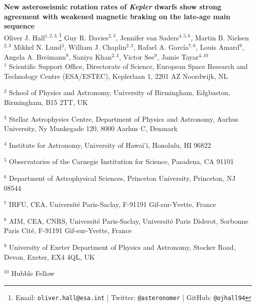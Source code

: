 \documentclass[12pt]{article}
\begin{document}
\noindent\textbf{\LARGE{New asteroseismic rotation rates of \emph{Kepler} dwarfs show strong agreement with weakened magnetic braking on the late-age main sequence}}\\

\noindent Oliver J. Hall$^{1,2,3,}$\footnote[1]{Email: \texttt{oliver.hall@esa.int} | Twitter: \texttt{@asteronomer} | GitHub: \texttt{@ojhall94}}
	Guy R. Davies$^{2,3}$, 
	Jennifer van Saders$^{4,5,6}$,
	Martin B. Nielsen$^{2,3}$
	Mikkel N. Lund$^{3}$, 
	William J. Chaplin$^{2,3}$, 
	Rafael A. Garc\'ia$^{7, 8}$, 
	Louis Amard$^{9}$,
	Angela A. Breimann$^{9}$, 
	Saniya Khan$^{2,3}$, 
	Victor See$^{9}$, 
	Jamie Tayar$^{4, 10}$
	\\
	
	\noindent $^{1}$ Scientific Support Office, Directorate of Science, European Space Research and Technology Centre (ESA/ESTEC), Keplerlaan 1, 2201 AZ Noordwijk, NL

	\noindent 	$^{2}$ School of Physics and Astronomy, University of Birmingham, Edgbaston, Birmingham, B15 2TT, UK

	\noindent 	$^{3}$ Stellar Astrophysics Centre, Department of Physics and Astronomy, Aarhus University, Ny Munkegade 120, 8000 Aarhus C, Denmark

	\noindent 	$^{4}$ Institute for Astronomy, University of Hawai'i, Honolulu, HI 96822

	\noindent 	$^{5}$ Observatories of the Carnegie Institution for Science, Pasadena, CA 91101

	\noindent 	$^{6}$ Department of Astrophysical Sciences, Princeton University, Princeton, NJ 08544

	\noindent 	$^{7}$ IRFU, CEA, Universit\'e Paris-Saclay, F-91191 Gif-sur-Yvette, France

	\noindent 	$^{8}$ AIM, CEA, CNRS, Universit\'e Paris-Saclay, Universit\'e Paris Diderot, Sorbonne Paris Cit\'e, F-91191 Gif-sur-Yvette, France

	\noindent 	$^{9}$ University of Exeter Department of Physics and Astronomy, Stocker Road, Devon, Exeter, EX4 4QL, UK
	
	\noindent $^{10}$ Hubble Fellow


\vspace{10mm}
\end{document}
